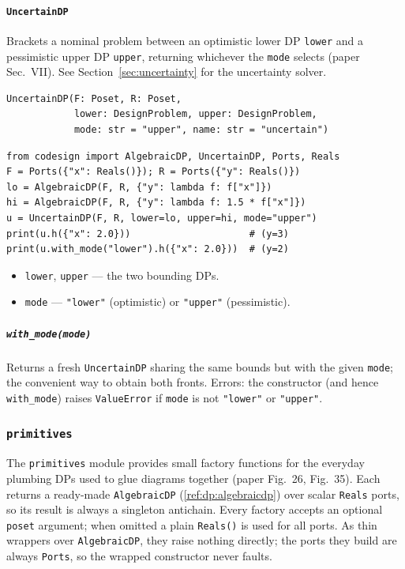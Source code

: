 \documentclass[11pt,a4paper]{article}
\begin{document}
\paragraph{\texttt{UncertainDP}}
\label{ref:dp:uncertaindp}
Brackets a nominal problem between an optimistic lower DP \texttt{lower}
and a pessimistic upper DP \texttt{upper}, returning whichever the
\texttt{mode} selects (paper Sec.~VII). See
Section~\ref{sec:uncertainty} for the uncertainty solver.
\begin{lstlisting}
UncertainDP(F: Poset, R: Poset,
            lower: DesignProblem, upper: DesignProblem,
            mode: str = "upper", name: str = "uncertain")
\end{lstlisting}
\begin{lstlisting}
from codesign import AlgebraicDP, UncertainDP, Ports, Reals
F = Ports({"x": Reals()}); R = Ports({"y": Reals()})
lo = AlgebraicDP(F, R, {"y": lambda f: f["x"]})
hi = AlgebraicDP(F, R, {"y": lambda f: 1.5 * f["x"]})
u = UncertainDP(F, R, lower=lo, upper=hi, mode="upper")
print(u.h({"x": 2.0}))                     # (y=3)
print(u.with_mode("lower").h({"x": 2.0}))  # (y=2)
\end{lstlisting}
\begin{itemize}[nosep]
  \item \texttt{lower}, \texttt{upper} --- the two bounding DPs.
  \item \texttt{mode} --- \texttt{"lower"} (optimistic) or
        \texttt{"upper"} (pessimistic).
\end{itemize}
\subparagraph{\texttt{with\_mode(mode)}}
\label{ref:dp:uncertaindp:with_mode}
Returns a fresh \texttt{UncertainDP} sharing the same bounds but with the
given \texttt{mode}; the convenient way to obtain both fronts.
\newline Errors: the constructor (and hence \texttt{with\_mode}) raises
\texttt{ValueError} if \texttt{mode} is not \texttt{"lower"} or
\texttt{"upper"}.

\subsubsection{\texttt{primitives}}
\label{ref:primitives}

The \texttt{primitives} module provides small factory functions for the
everyday plumbing DPs used to glue diagrams together (paper Fig.~26,
Fig.~35). Each returns a ready-made \texttt{AlgebraicDP}
(\ref{ref:dp:algebraicdp}) over scalar \texttt{Reals} ports, so its
result is always a singleton antichain. Every factory accepts an
optional \texttt{poset} argument; when omitted a plain \texttt{Reals()}
is used for all ports. As thin wrappers over \texttt{AlgebraicDP}, they
raise nothing directly; the ports they build are always \texttt{Ports},
so the wrapped constructor never faults.
\end{document}
